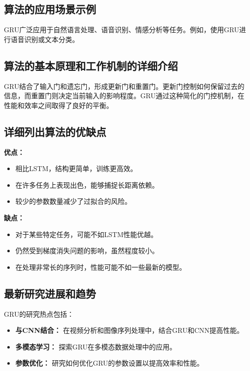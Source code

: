 \subsection*{算法的应用场景示例}
GRU广泛应用于自然语言处理、语音识别、情感分析等任务。例如，使用GRU进行语音识别或文本分类。

\subsection*{算法的基本原理和工作机制的详细介绍}
GRU结合了输入门和遗忘门，形成更新门和重置门。更新门控制如何保留过去的信息，而重置门则决定当前输入的影响程度。GRU通过这种简化的门控机制，在性能和效率之间取得了良好的平衡。

\subsection*{详细列出算法的优缺点}
\textbf{优点：}
\begin{itemize}
    \item 相比LSTM，结构更简单，训练更高效。
    \item 在许多任务上表现出色，能够捕捉长距离依赖。
    \item 较少的参数数量减少了过拟合的风险。
\end{itemize}

\textbf{缺点：}
\begin{itemize}
    \item 对于某些特定任务，可能不如LSTM性能优越。
    \item 仍然受到梯度消失问题的影响，虽然程度较小。
    \item 在处理非常长的序列时，性能可能不如一些最新的模型。
\end{itemize}

\subsection*{最新研究进展和趋势}
GRU的研究热点包括：
\begin{itemize}
    \item \textbf{与CNN结合：} 在视频分析和图像序列处理中，结合GRU和CNN提高性能。
    \item \textbf{多模态学习：} 探索GRU在多模态数据处理中的应用。
    \item \textbf{参数优化：} 研究如何优化GRU的参数设置以提高效率和性能。
\end{itemize}
